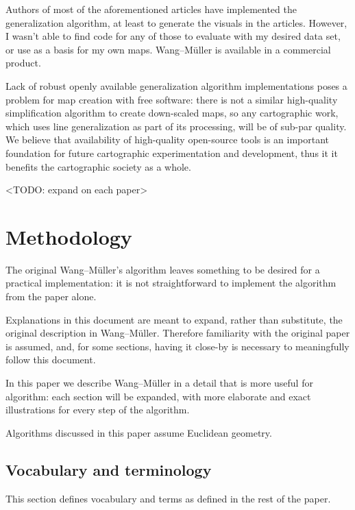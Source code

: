 \documentclass[a4paper]{article}
\newcommand{\WM}{Wang--M{\"u}ller}
\begin{document}
Authors of most of the aforementioned articles have implemented the
generalization algorithm, at least to generate the visuals in the articles.
However, I wasn't able to find code for any of those to evaluate with my
desired data set, or use as a basis for my own maps. {\WM} \cite{wang1998line}
is available in a commercial product.

Lack of robust openly available generalization algorithm implementations poses
a problem for map creation with free software: there is not a similar
high-quality simplification algorithm to create down-scaled maps, so any
cartographic work, which uses line generalization as part of its processing,
will be of sub-par quality. We believe that availability of high-quality
open-source tools is an important foundation for future cartographic
experimentation and development, thus it it benefits the cartographic society
as a whole.

<TODO: expand on each paper>

\section{Methodology}
\label{sec:methodology}

The original {\WM}'s algorithm \cite{wang1998line} leaves something to be
desired for a practical implementation: it is not straightforward to implement
the algorithm from the paper alone.

Explanations in this document are meant to expand, rather than substitute, the
original description in {\WM}. Therefore familiarity with the original paper is
assumed, and, for some sections, having it close-by is necessary to
meaningfully follow this document.

In this paper we describe {\WM} in a detail that is more useful for algorithm:
each section will be expanded, with more elaborate and exact illustrations for
every step of the algorithm.

Algorithms discussed in this paper assume Euclidean geometry.

\subsection{Vocabulary and terminology}

This section defines vocabulary and terms as defined in the rest of the paper.
\end{document}
